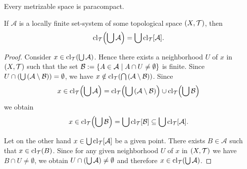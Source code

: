 \begin{theorem}\label{theorem:stone}
	Every metrizable space is paracompact. \cite{Top}
\end{theorem}

\begin{lemma} \label{lemma:locally_finite_system} \cite[p. 63]{Top}
	If $\mathcal{A}$ is a locally finite set-system of some topological space $\tspace$, then
	\begin{align*}
	\mathrm{cl}_\mathcal{T}{\left ( \bigcup \mathcal{A} \right )} = \bigcup \mathrm{cl}_\mathcal{T}{\left [ \mathcal{A} \right ]}.
	\end{align*}
\end{lemma}

\begin{proof}
	Consider $x \in \mathrm{cl}_\mathcal{T}{\left ( \bigcup \mathcal{A} \right )}$. Hence there exists a neighborhood $U$ of $x$ in $\tspace$ such that the set $\mathcal{B} := {\left \{ A \in \mathcal{A} \mid A \cap U \neq \emptyset \right \}}$ is finite. Since $U \cap {\left ( \bigcup {\left ( \mathcal{A} \setminus \mathcal{B} \right )} \right )} = \emptyset$, we have $x \notin \mathrm{cl}_\mathcal{T}{\left ( \bigcap{\left ( \mathcal{A} \setminus \mathcal{B} \right )} \right )}$. Since
	\begin{align*}
	x \in \mathrm{cl}_\mathcal{T}{\left ( \bigcup \mathcal{A} \right )} = \mathrm{cl}_\mathcal{T}{\left ( \bigcup{\left ( \mathcal{A} \setminus \mathcal{B} \right )} \right )} \cup \mathrm{cl}_\mathcal{T}{\left ( \bigcup \mathcal{B} \right )}
	\end{align*}
	we obtain
	\begin{align*}
	x \in \mathrm{cl}_\mathcal{T}{\left ( \bigcup \mathcal{B} \right )} = \bigcup \mathrm{cl}_\mathcal{T}{\left [ \mathcal{B} \right ]} \subseteq \bigcup \mathrm{cl}_\mathcal{T}{\left [ \mathcal{A} \right ]}.
	\end{align*}
	
	Let on the other hand $x \in \bigcup\mathrm{cl}_\mathcal{T}{\left [ \mathcal{A} \right ]}$ be a given point. There exists $B \in \mathcal{A}$ such that $x \in \mathrm{cl}_\mathcal{T}{\left ( B \right )}$. Since for any given neighborhood $U$ of $x$ in $\tspace$ we have $B \cap U \neq \emptyset$, we obtain $U \cap {\left ( \bigcup \mathcal{A} \right )} \neq \emptyset$ and therefore $x \in \mathrm{cl}_\mathcal{T}{\left ( \bigcup \mathcal{A} \right )}$. 
\end{proof}


